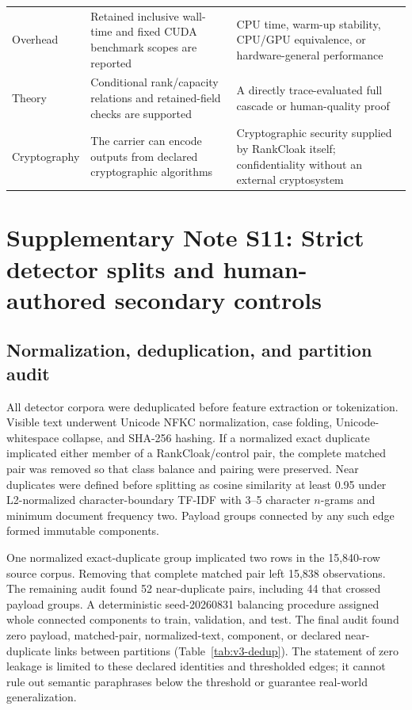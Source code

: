 \documentclass[fleqn,10pt]{wlscirep}
\begin{document}
\begin{longtable}{L{0.25\textwidth}L{0.31\textwidth}L{0.35\textwidth}}
Overhead & Retained inclusive wall-time and fixed CUDA benchmark scopes are reported & CPU time, warm-up stability, CPU/GPU equivalence, or hardware-general performance \\
Theory & Conditional rank/capacity relations and retained-field checks are supported & A directly trace-evaluated full cascade or human-quality proof \\
Cryptography & The carrier can encode outputs from declared cryptographic algorithms & Cryptographic security supplied by RankCloak itself; confidentiality without an external cryptosystem \\
\bottomrule
\end{longtable}

\section*{Supplementary Note S11: Strict detector splits and human-authored secondary controls}\label{si:s11}

\subsection*{Normalization, deduplication, and partition audit}

All detector corpora were deduplicated before feature extraction or tokenization. Visible text underwent Unicode NFKC normalization, case folding, Unicode-whitespace collapse, and SHA-256 hashing. If a normalized exact duplicate implicated either member of a RankCloak/control pair, the complete matched pair was removed so that class balance and pairing were preserved. Near duplicates were defined before splitting as cosine similarity at least 0.95 under L2-normalized character-boundary TF-IDF with 3--5 character \(n\)-grams and minimum document frequency two. Payload groups connected by any such edge formed immutable components.

One normalized exact-duplicate group implicated two rows in the 15,840-row source corpus. Removing that complete matched pair left 15,838 observations. The remaining audit found 52 near-duplicate pairs, including 44 that crossed payload groups. A deterministic seed-20260831 balancing procedure assigned whole connected components to train, validation, and test. The final audit found zero payload, matched-pair, normalized-text, component, or declared near-duplicate links between partitions (Table~\ref{tab:v3-dedup}). The statement of zero leakage is limited to these declared identities and thresholded edges; it cannot rule out semantic paraphrases below the threshold or guarantee real-world generalization.
\end{document}
